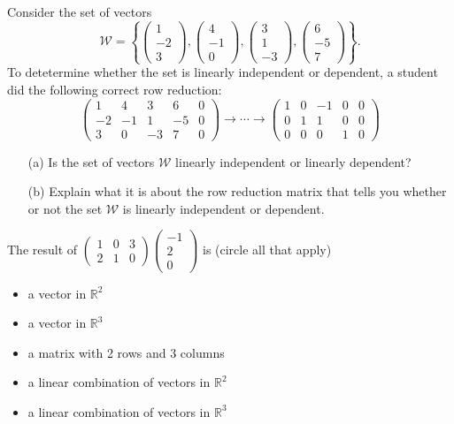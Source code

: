 \begin{problem}
    Consider the set of vectors 
    \[ \mathcal{W} = \left\{ \begin{pmatrix}1 \\ -2 \\ 3\end{pmatrix},
        \begin{pmatrix}4\\-1\\0\end{pmatrix},
        \begin{pmatrix}3\\1\\-3\end{pmatrix},\begin{pmatrix}6\\-5\\7\end{pmatrix}
    \right\}. \]
    To detetermine whether the set is linearly independent or dependent, a student did
    the following correct row reduction:
    \[ \left(\begin{array}{cccc|c} 1&4&3&6&0\\-2&-1&1&-5&0\\3&0&-3&7&0\end{array} \right)
        \to \cdots \to \left( \begin{array}{cccc|c} 1&0&-1&0&0 \\ 0&1&1&0&0 \\
        0&0&0&1&0\end{array} \right) \]
    \begin{enumerate}
        \item[(a)] Is the set of vectors $\mathcal{W}$ linearly independent or linearly
            dependent?
        \item[(b)] Explain what it is about the row reduction matrix that tells you
            whether or not the set $\mathcal{W}$ is linearly independent or dependent.
    \end{enumerate}
\end{problem}



\begin{problem}
    The result of $\begin{pmatrix} 1&0&3\\2&1&0\end{pmatrix}
    \begin{pmatrix}-1\\2\\0\end{pmatrix}$ is (circle all that apply)
    \begin{itemize}
        \item a vector in $\mathbb{R}^2$
        \item a vector in $\mathbb{R}^3$
        \item a matrix with 2 rows and 3 columns
        \item a linear combination of vectors in $\mathbb{R}^2$
        \item a linear combination of vectors in $\mathbb{R}^3$
    \end{itemize}
\end{problem}


